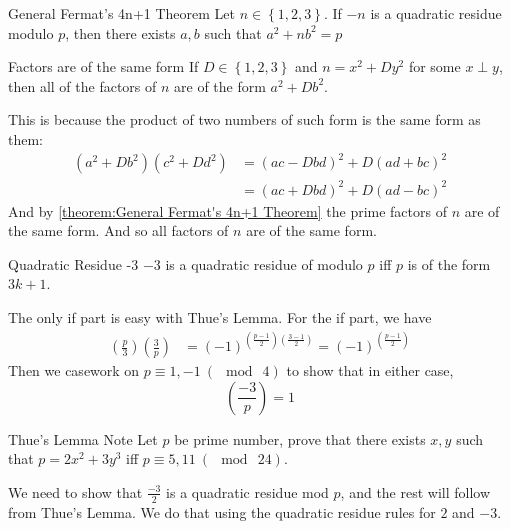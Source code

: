 \theo{}
{General Fermat's 4n+1 Theorem}{
    Let $n\in \left\{1, 2, 3\right\}$. If $-n$ is a quadratic residue modulo
    $p$, then there exists $a, b$ such that $a^2 + nb^2 = p$
}

\thmbox{}
{Factors are of the same form}{
    If $D\in \left\{1, 2, 3\right\}$ and $n = x^2 + Dy^2$ for some $x\perp y$,
    then all of the factors of $n$ are of the form $a^2 + Db^2$.
}

\begin{prooof}
    This is because the product of two numbers of such form is the same form
    as them:
    \[\begin{aligned}
        \left(a^2+Db^2\right)\left(c^2 + Dd^2\right) &=\left(ac-Dbd\right)^2 +
        D\left(ad+bc\right)^2\\
        &=\left(ac+Dbd\right)^2 + D\left(ad-bc\right)^2
    \end{aligned}\] 
    And by \autoref{theorem:General Fermat's 4n+1 Theorem} the prime factors
    of $n$ are of the same form. And so all factors of $n$ are of the same form.
\end{prooof}


\thmbox{}
{Quadratic Residue -3}{
    $-3$ is a quadratic residue of modulo $p$ iff $p$ is of the form $3k+1$.
}
\begin{prooof}
    The only if part is easy with Thue's Lemma. For the if part, we have
    \[\begin{aligned}
        \left(\frac{p}{3}\right)\left(\frac{3}{p}\right) &=
        (-1)^{\left(\frac{p-1}{2}\right) \left(\frac{3-1}{2}\right)}=
        (-1)^{\left(\frac{p-1}{2}\right) }
    \end{aligned}\] 
    Then we casework on $p\equiv 1, -1 \ (\mod\ 4)$ to show that in either
    case, \[\left(\frac{-3}{p}\right) = 1\]
\end{prooof}



\prob{}
{Thue's Lemma Note}{}{
    Let $p$ be prime number, prove that there exists $x, y$ such that
    $p=2x^2+3y^3$ iff $p\equiv 5, 11 \ (\mod\ 24)$.   
}

\begin{solution}
    We need to show that $\frac{-3}{2}$ is a quadratic residue mod $p$, and
    the rest will follow from Thue's Lemma. We do that using the quadratic
    residue rules for $2$ and $-3$.
\end{solution}
